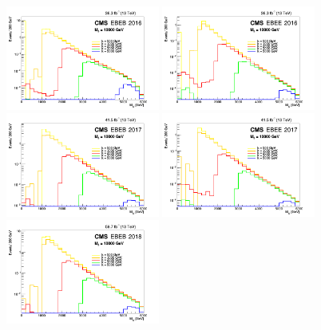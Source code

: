 \begin{figure}[tbp!]
\begin{center}
 \includegraphics[angle=0,width=0.45\textwidth]{fig/2016EBEB.png}\hfill
    \includegraphics[angle=0,width=0.45\textwidth]{fig/2016EBEE.png}\\[0.5em]
    \includegraphics[angle=0,width=0.45\textwidth]{fig/2017EBEB.png}\hfill
    \includegraphics[angle=0,width=0.45\textwidth]{fig/2017EBEE.png}\\[0.5em]
    \includegraphics[angle=0,width=0.45\textwidth]{fig/2018EBEB.png}\hfill

\end{center}
\end{figure}
